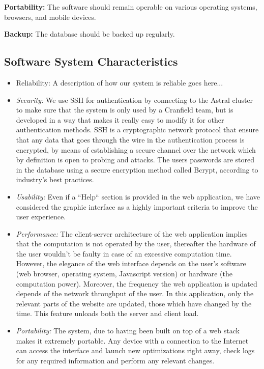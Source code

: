 \documentclass{article}
\begin{document}
\noindent\textbf{Portability:}
The software should remain operable on various operating systems, browsers, and mobile devices.
\\\par


\noindent\textbf{Backup:}
The database should be backed up regularly.
\\\par





\subsection{Software System Characteristics}
\label{sec:software_characteristics}

\begin{itemize}
   \item  Reliability: A description of  how our system is reliable goes here...

   \item  \textit{Security:} We use SSH for authentication by connecting to the Astral cluster to make sure that the system is only used by a Cranfield team, but is developed in a way that makes it really easy to modify it for other authentication methods. SSH is a cryptographic network protocol that ensure that any data that goes through the wire in the authentication process is encrypted, by means of establishing a secure channel over the network which by definition is open to probing and attacks. The users passwords are stored in the database using a secure encryption method called Bcrypt, according to industry's best practices. 
   

   \item  \textit{Usability:} Even if a ``Help`` section is provided in the web application, we have considered the graphic interface as a highly important criteria to improve the user experience. 

   \item  \textit{Performance:} The client-server architecture of the web application implies that the computation is not operated by the user, thereafter the hardware of the user wouldn't be faulty in case of an excessive computation time. However, the elegance of the web interface depends on the user's software (web browser, operating system, Javascript version) or hardware (the computation power). Moreover, the frequency the web application is updated depends of the network throughput of the user. In this application, only the relevant parts of the website are updated, those which have changed by the time. This feature unloads both the server and client load.

   \item  \textit{Portability:} The system, due to having been built on top of a web stack makes it extremely portable. Any device with a connection to the Internet can access the interface and launch new optimizations right away, check logs for any required information and perform any relevant changes.

\end{itemize}
\end{document}
